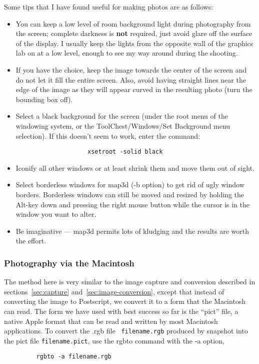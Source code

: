 Some tips that I have found useful for making photos are as follows:
%
\begin{itemize}
  \item You can keep a low level of room background light during photography
        from the screen; complete darkness is {\bf not} required, just
        avoid glare off the surface of the display.  I
        usually keep the lights from the opposite wall of the graphics lab
        on at a low level, enough to see my way around during the shooting.
  \item If you have the choice, keep the image towards the center of the
        screen and do not let it fill the entire screen.  Also, avoid having
        straight lines near the edge of the image as they will appear
        curved in the resulting photo (turn the bounding box off).
  \item Select a black background for the screen (under the root menu of
        the windowing system, or the ToolChest/Windows/Set Background menu
        selection).  If this doesn't seem to work, enter the command:\\
        \begin{verbatim}
                    xsetroot -solid black
        \end{verbatim}
  \item Iconify all other windows or at least shrink them and move them out
        of sight.
  \item Select borderless windows for map3d (-b option) to get rid of ugly
        window borders.  Borderless windows can still be moved and resized by
        holding the Alt-key down and pressing the right mouse button while
        the cursor is in the window you want to alter.
  \item Be imaginative --- map3d permits lots of kludging and the results
        are worth the effort.
\end{itemize}

\subsubsection{Photography via the Macintosh}

The method here is very similar to the image capture and conversion
described in sections~\ref{sec:capture} and~\ref{sec:image-conversion},
except that instead of converting the image to Postscript, we convert it to
a form that the Macintosh can read.  The form we have used with best
success so far is the ``pict'' file, a native Apple format that can be read
and written by most Macintosh applications.  To convert the .rgb file {\tt
filename.rgb} produced by snapshot into the pict file {\tt filename.pict},
use the rgbto command with the -a option, \eg{}
%
\begin{verbatim}
         rgbto -a filename.rgb 
\end{verbatim}

